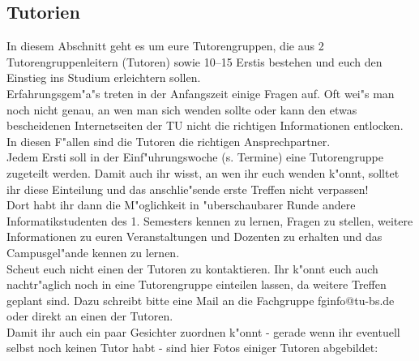 \subsection{Tutorien}

In diesem Abschnitt geht es um eure Tutorengruppen, die aus 2 Tutorengruppenleitern (Tutoren) sowie 10--15 Erstis bestehen und euch den Einstieg ins Studium erleichtern sollen.\\
Erfahrungsgem"a"s treten in der Anfangszeit einige Fragen auf. Oft wei"s man noch nicht genau, an wen man sich wenden sollte oder kann den etwas bescheidenen Internetseiten der TU nicht die richtigen Informationen entlocken. In diesen F"allen sind die Tutoren die richtigen Ansprechpartner.\\
Jedem Ersti soll in der Einf"uhrungswoche (s. Termine) eine Tutorengruppe zugeteilt werden. Damit auch ihr wisst, an wen ihr euch wenden k"onnt, solltet ihr diese Einteilung und das anschlie"sende erste Treffen nicht verpassen!\\
Dort habt ihr dann die M"oglichkeit in "uberschaubarer Runde andere Informatikstudenten des 1. Semesters kennen zu lernen, Fragen zu stellen, weitere Informationen zu euren Veranstaltungen und Dozenten zu erhalten und das Campusgel"ande kennen zu lernen.\\
Scheut euch nicht einen der Tutoren zu kontaktieren. Ihr k"onnt euch auch nachtr"aglich noch in eine Tutorengruppe einteilen lassen, da weitere Treffen geplant sind. Dazu schreibt bitte eine Mail an die Fachgruppe fginfo@tu-bs.de oder direkt an einen der Tutoren.\\
Damit ihr auch ein paar Gesichter zuordnen k"onnt - gerade wenn ihr eventuell selbst noch keinen Tutor habt - sind hier Fotos einiger Tutoren abgebildet:

\onecolumn


